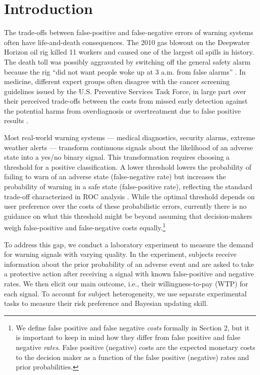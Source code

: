 \documentclass[12pt,a4paper]{article}
\begin{document}
\vspace{180pt}
\newpage
\normalsize

\section{Introduction}

The trade-offs between false-positive and false-negative errors of warning systems often have life-and-death consequences. The 2010 gas blowout on the Deepwater Horizon oil rig killed 11 workers and caused one of the largest oil spills in history. The death toll was possibly aggravated by switching off the general safety alarm because the rig ``did not want people woke up at 3 a.m. from false alarms'' \citep{brown_oil_2010}. In medicine, different expert groups often disagree with the cancer screening guidelines issued by the U.S. Preventive Services Task Force, in large part over their perceived trade-offs between the costs from missed early detection against the potential harms from overdiagnosis or overtreatment due to false positive results \citep{rabin_reversal_2024}.

Most real-world warning systems --- medical diagnostics, security alarms, extreme weather alerts --- transform continuous signals about the likelihood of an adverse state into a yes/no binary signal. This transformation requires choosing a threshold for a positive classification. A lower threshold lowers the probability of failing to warn of an adverse state (false-negative rate) but increases the probability of warning in a safe state (false-positive rate), reflecting the standard trade-off characterized in ROC analysis \citep{fawcett_introduction_2006}. While the optimal threshold depends on user preference over the costs of these probabilistic errors, currently there is no guidance on what this threshold might be beyond assuming that decision-makers weigh false-positive and false-negative costs equally.\footnote{We define false positive and false negative \textit{costs} formally in Section 2, but it is important to keep in mind how they differ from false positive and false negative \textit{rates}.  False positive (negative) costs are the expected monetary costs to the decision maker as a function of the false positive (negative) rates and prior probabilities.}


To address this gap, we conduct a laboratory experiment to measure the demand for warning signals with varying quality.
In the experiment, subjects receive information about the prior probability of an adverse event and are asked to take a protective action after receiving a signal with known false-positive and negative rates. We then elicit our main outcome, i.e., their willingness-to-pay (WTP) for each signal. To account for subject heterogeneity, we use separate experimental tasks to measure their risk preference and Bayesian updating skill.
\end{document}
